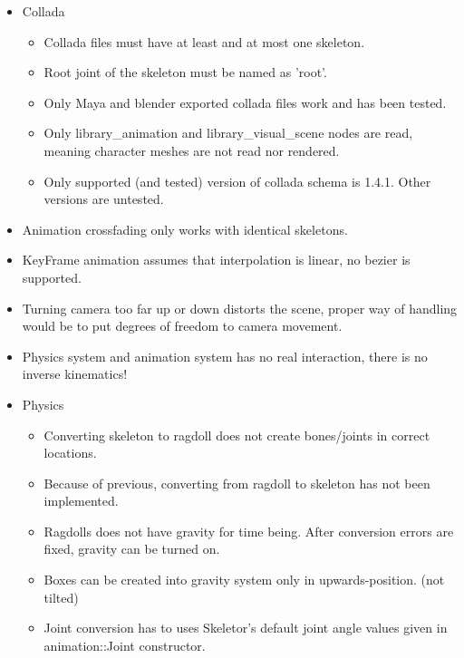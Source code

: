 \documentclass[11pt,twoside,a4paper]{article}
\begin{document}
\begin{itemize}
  \item Collada
  \begin{itemize}
    \item Collada files must have at least and at most one skeleton.
    \item Root joint of the skeleton must be named as 'root'.
    \item Only Maya and blender exported collada files work and has been tested.
    \item Only library\_animation and library\_visual\_scene nodes are read, meaning character meshes are not read nor rendered.
    \item Only supported (and tested) version of collada schema is 1.4.1. Other versions are untested.
  \end{itemize}
  \item Animation crossfading only works with identical skeletons.
  \item KeyFrame animation assumes that interpolation is linear, no bezier is supported.
  \item Turning camera too far up or down distorts the scene, proper way of handling would be to put degrees of freedom to camera movement.
  \item Physics system and animation system has no real interaction, there is no inverse kinematics!
  \item Physics
  \begin{itemize}
    \item Converting skeleton to ragdoll does not create bones/joints in correct locations.
    \item Because of previous, converting from ragdoll to skeleton has not been implemented.
    \item Ragdolls does not have gravity for time being. After conversion errors are fixed, gravity can be turned on.
    \item Boxes can be created into gravity system only in upwards-position. (not tilted)
    \item Joint conversion has to uses Skeletor's default joint angle values given in animation::Joint constructor.
  \end{itemize}
\end{itemize}
\end{document}
